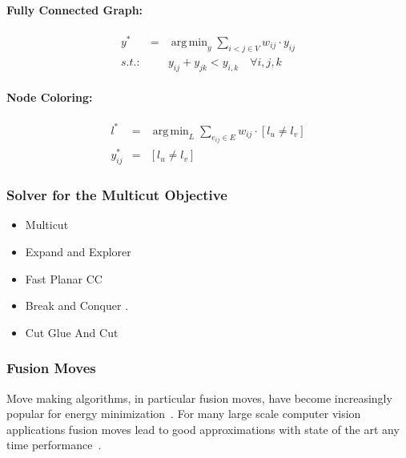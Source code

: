 \documentclass[10pt,twocolumn,letterpaper]{article}
\DeclareMathOperator*{\argmin}{arg\,min}
\begin{document}
\paragraph{Fully Connected Graph:}
\begin{center}
    \begin{eqnarray}
        y^*   & = & \argmin_{y} \sum_{ i<j \in V } w_{ij} \cdot y_{ij} \\
        s.t.: &  & y_{ij} + y_{jk} < y_{i,k} \quad \forall i, j, k   \nonumber
    \end{eqnarray}
\end{center}

\paragraph{Node Coloring:}
\begin{center}
    \begin{eqnarray}
        l^* &=& \argmin_{L} \sum_{ e_{ij} \in E } w_{ij} \cdot [l_{u} \neq l_{v}] \\
        y_{ij}^* &=& [l_{u} \neq l_{v}]  
    \end{eqnarray}
\end{center}



\subsubsection{Solver for the Multicut Objective}
    
    


   \begin{itemize}
   \item Multicut~\cite{kappes_2011_emmcvpr}
   \item Expand and Explorer~\cite{bagon_2011_arxiv}
   \item Fast Planar CC~\cite{yarkony_2012_eccv}
   \item Break and Conquer \cite{alush_2013_simbad}.
   \item Cut Glue And Cut~\cite{beier_2014_cvpr}
   \end{itemize}

\subsubsection{Fusion Moves}
Move making algorithms, in particular fusion moves, 
have become increasingly popular for energy minimization~\cite{???,kappes_2014_ws}.
For many large scale computer vision applications fusion moves lead to good approximations
with state of the art any time performance~\cite{kappes_2014_ws}.
\end{document}

